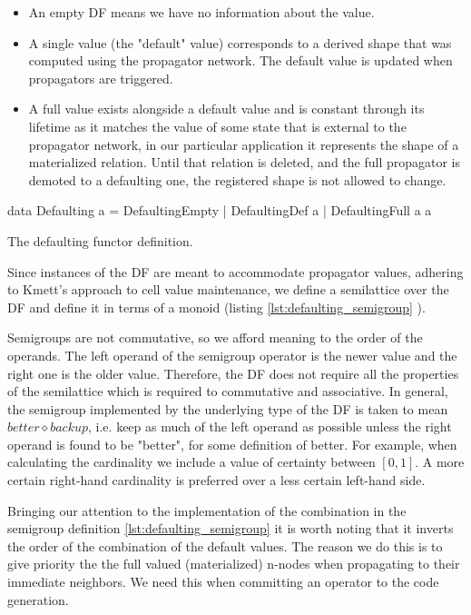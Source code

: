 \begin{itemize}
\item An empty DF means we have no information about the value.
\item A single value (the "default" value) corresponds to a derived
  shape that was computed using the propagator network. The default
  value is updated when propagators are triggered.
\item A full value exists alongside a default value and is constant
  through its lifetime as it matches the value of some state that is
  external to the propagator network, in our particular application it
  represents the shape of a materialized relation. Until that relation
  is deleted, and the full propagator is demoted to a defaulting one,
  the registered shape is not allowed to change.
\end{itemize}

\begin{code}
  \begin{haskellcode}
    data Defaulting a =
      DefaultingEmpty
      | DefaultingDef a
      | DefaultingFull a a
  \end{haskellcode}

  \caption{\label{lst:defaulting_functor}The defaulting functor definition.}
\end{code}

Since instances of the DF are meant to accommodate propagator values,
adhering to Kmett's approach to cell value maintenance, we define a
semilattice over the DF and define it in terms of a monoid (listing
\ref{lst:defaulting_semigroup} ).

Semigroups are not commutative, so we afford meaning to the order of the operands. The
left operand of the semigroup operator is the newer value and the
right one is the older value. Therefore, the DF does not require all
the properties of the semilattice which is required to commutative and
associative. In general, the semigroup implemented by the underlying
type of the DF is taken to mean
\(\mathit{better} \diamond \mathit{backup}\), i.e. keep as much of the
left operand as possible unless the right operand is found to be
"better", for some definition of better. For example, when calculating
the cardinality we include a value of certainty between
\(\left[0,1\right]\).  A more certain right-hand cardinality is
preferred over a less certain left-hand side.

Bringing our attention to the implementation of the 
combination in the semigroup definition \ref{lst:defaulting_semigroup}
it is worth noting that it inverts the order of the combination of the
default values. The reason we do this is to give priority the the full
valued (materialized) n-nodes when propagating to their immediate
neighbors. We need this when committing an operator to the code
generation.

